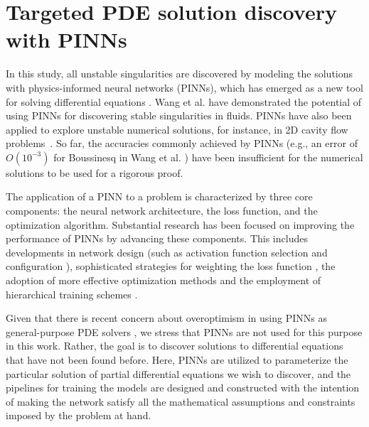 \documentclass[fleqn,11pt]{wlscirep}
\begin{document}
\section*{Targeted PDE solution discovery with PINNs}

In this study, all unstable singularities are discovered by modeling the solutions with physics-informed neural networks (PINNs), which has emerged as a new tool for solving differential equations \cite{Raissi-Perdikaris-Karniadakis:pinn-first-paper,Karniadakis-Kevrekidis-Lu-Perdikaris-Wang-Yang:pinn-nature-reviews}. Wang et al. \cite{Wang-Lai-GomezSerrano-Buckmaster:pinn-selfsimilar-boussinesq} have demonstrated the potential of using PINNs for discovering stable singularities in fluids. PINNs have also been applied to explore unstable numerical solutions, for instance, in 2D cavity flow problems~\cite{wang2023solution, zou2025learning}. So far, the accuracies commonly achieved by PINNs (e.g., an error of $O(10^{-3})$ for Boussinesq in Wang et al. \cite{Wang-Lai-GomezSerrano-Buckmaster:pinn-selfsimilar-boussinesq}) have been insufficient for the numerical solutions to be used for a rigorous proof.

The application of a PINN to a problem is characterized by three core components: the neural network architecture, the loss function, and the optimization algorithm. Substantial research has been focused on improving the performance of PINNs by advancing these components. This includes developments in network design (such as activation function selection \cite{jagtap2020adaptive, wang2023learning} and configuration \cite{jagtap2021extended, moseley2023finite}), sophisticated strategies for weighting the loss function \cite{mcclenny2020self, wang2021understanding, wang2022and, wang2022respecting}, the adoption of more effective optimization methods \cite{muller2023achieving,Jnini-Vella-Zeinhofer:gauss-newton-natural-gradient-pinn} and the employment of hierarchical training schemes \cite{aldirany2024multi, Wang-Lai:multistage-nn}. 

Given that there is recent concern about overoptimism in using PINNs as general-purpose PDE solvers \cite{mcgreivy2024weak}, we stress that PINNs are not used for this purpose in this work. Rather, the goal is to discover solutions to differential equations that have not been found before. Here, PINNs are utilized to parameterize the particular solution of partial differential equations we wish to discover, and the pipelines for training the models are designed and constructed with the intention of making the network satisfy all the mathematical assumptions and constraints imposed by the problem at hand.
\end{document}
